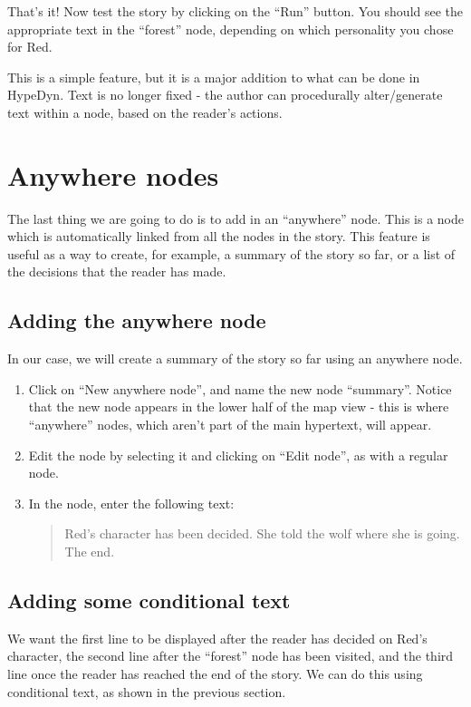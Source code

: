 \documentclass{article}
\begin{document}
That's it! Now test the story by clicking on the ``Run'' button. You should see
the appropriate text in the ``forest'' node, depending on which personality you
chose for Red.

This is a simple feature, but it is a major addition to what can be done in
HypeDyn. Text is no longer fixed - the author can procedurally alter/generate
text within a node, based on the reader's actions.

\section{Anywhere nodes}

The last thing we are going to do is to add in an ``anywhere'' node. This is a
node which is automatically linked from all the nodes in the story. This
feature is useful as a way to create, for example, a summary of the story so
far, or a list of the decisions that the reader has made. 

\subsection{Adding the anywhere node}
In our case, we will create a summary of the story so far using an anywhere
node.

\begin{enumerate}
  \item Click on ``New anywhere node'', and name the new node ``summary''.
  Notice that the new node appears in the lower half of the map view - this is
  where ``anywhere'' nodes, which aren't part of the main hypertext, will
  appear.
  \item Edit the node by selecting it and clicking on ``Edit node'', as with a
  regular node.
  \item In the node, enter the following text:
  \begin{quotation}
  Red's character has been decided.
  She told the wolf where she is going.
  The end.
  \end{quotation}
\end{enumerate}

\subsection{Adding some conditional text}
We want the first line to be displayed after the reader has decided on Red's
character, the second line after the ``forest'' node has been visited, and the
third line once the reader has reached the end of the story. We can do this
using conditional text, as shown in the previous section.
\end{document}
